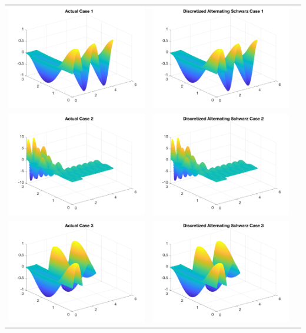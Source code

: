 \documentclass[11pt]{article}
\theoremstyle{definition}
\theoremstyle{remark}
\theoremstyle{plain}
\begin{document}
\begin{center}
  \begin{tabular}{ccc}
    \includegraphics[width=0.3\linewidth]{../Figures/final_4_actual_1.png}&\includegraphics[width=0.3\linewidth]{../Figures/final_4_add_1.png}&\\
    \includegraphics[width=0.3\linewidth]{../Figures/final_4_actual_2.png}&\includegraphics[width=0.3\linewidth]{../Figures/final_4_add_2.png}&\\
    \includegraphics[width=0.3\linewidth]{../Figures/final_4_actual_3.png}&\includegraphics[width=0.3\linewidth]{../Figures/final_4_add_3.png}&\\

\end{tabular}
\end{center}
\end{document}
